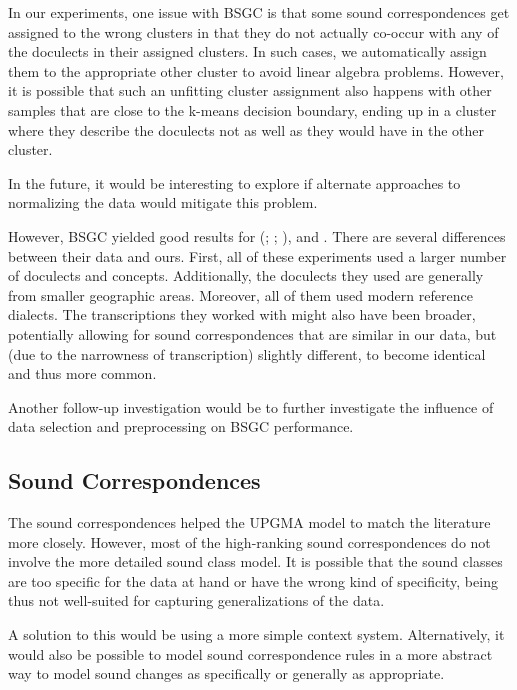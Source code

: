 \documentclass[a4paper]{article}
\begin{document}
In our experiments, one issue with BSGC is that some
sound correspondences get assigned to the wrong clusters
in that they do not actually co-occur with any of the
doculects in their assigned clusters.
In such cases, we automatically assign them to the appropriate
other cluster to avoid linear algebra problems.
However, it is possible that such an unfitting
cluster assignment also happens with other samples
that are close to the k-means decision boundary,
ending up in a cluster where they describe the doculects
not as well as they would have in the other cluster.

In the future, it would be interesting to
explore if alternate approaches to normalizing the data
would mitigate this problem.

However, BSGC yielded good results for \citeauthor{wieling2011bipartite}
(\citeyear{wieling2009bipartite}; \citeyear{wieling2010hierarchical}; \citeyear{wieling2011bipartite}),
\citet{wieling2013analyzing} and \citet{montemagni2013synchronic}.
There are several differences between their data and ours.
First, all of these experiments used a larger number
of doculects and concepts.
Additionally, the doculects they used are
generally from smaller geographic areas.
Moreover, all of them used modern reference dialects.
The transcriptions they worked with might also have been broader,
potentially allowing for sound correspondences that are similar in our data,
but (due to the narrowness of transcription) slightly different,
to become identical and thus more common.

Another follow-up investigation would be to
further investigate the influence of
data selection and preprocessing on BSGC performance.

\subsection{Sound Correspondences}

The sound correspondences helped the UPGMA model
to match the literature more closely.
However, most of the high-ranking sound correspondences
do not involve the more detailed sound class model.
It is possible that the sound classes are too specific
for the data at hand or have the wrong kind of specificity,
being thus not well-suited for capturing generalizations of the data.

A solution to this would be using a more simple context system.
Alternatively, it would also be possible to model sound correspondence
rules in a more abstract way to model sound changes
as specifically or generally as appropriate.
\end{document}
